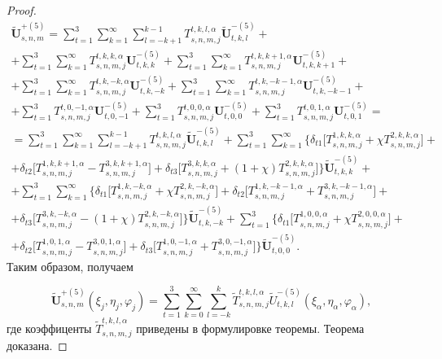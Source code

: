 \begin{proof}
\begin{multline}
\mathbf{\tilde U}_{s,n,m}^{+(5)}=\sum\limits_{t=1}^3\sum\limits_{k=1}^\infty\sum\limits_{l=-k+1}^{k-1}T_{s,n,m,j}^{t,k,l,\alpha}\mathbf{\tilde U}_{t,k,l}^{-(5)}+ \\
+\sum\limits_{t=1}^3\sum\limits_{k=1}^\infty T_{s,n,m,j}^{t,k,k,\alpha}\mathbf{U}_{t,k,k}^{-(5)}+\sum\limits_{t=1}^3\sum\limits_{k=1}^\infty T_{s,n,m,j}^{t,k,k+1,\alpha}\mathbf{U}_{t,k,k+1}^{-(5)}+ \\
+\sum\limits_{t=1}^3\sum\limits_{k=1}^\infty T_{s,n,m,j}^{t,k,-k,\alpha}\mathbf{U}_{t,k,-k}^{-(5)}+\sum\limits_{t=1}^3\sum\limits_{k=1}^\infty T_{s,n,m,j}^{t,k,-k-1,\alpha}\mathbf{U}_{t,k,-k-1}^{-(5)}+ \\
+\sum\limits_{t=1}^3 T_{s,n,m,j}^{t,0,-1,\alpha}\mathbf{U}_{t,0,-1}^{-(5)}+\sum\limits_{t=1}^3 T_{s,n,m,j}^{t,0,0,\alpha}\mathbf{U}_{t,0,0}^{-(5)}+\sum\limits_{t=1}^3 T_{s,n,m,j}^{t,0,1,\alpha}\mathbf{U}_{t,0,1}^{-(5)}= \\
=\sum\limits_{t=1}^3\sum\limits_{k=1}^\infty\sum\limits_{l=-k+1}^{k-1}T_{s,n,m,j}^{t,k,l,\alpha}\mathbf{\tilde U}_{t,k,l}^{-(5)}+\sum\limits_{t=1}^3\sum\limits_{k=1}^\infty\bigg\{\delta_{t1}\bigg\lbrack T_{s,n,m,j}^{1,k,k,\alpha}+\chi T_{s,n,m,j}^{2,k,k,\alpha}\bigg\rbrack+ \\
+\delta_{t2}\bigg\lbrack T_{s,n,m,j}^{1,k,k+1,\alpha}-T_{s,n,m,j}^{3,k,k+1,\alpha}\bigg\rbrack+\delta_{t3}\bigg\lbrack T_{s,n,m,j}^{3,k,k,\alpha}+(1+\chi)T_{s,n,m,j}^{2,k,k,\alpha}\bigg\rbrack\bigg\}\mathbf{\tilde U}_{t,k,k}^{-(5)}+ \\
+\sum\limits_{t=1}^3\sum\limits_{k=1}^\infty\bigg\{\delta_{t1}\bigg\lbrack T_{s,n,m,j}^{1,k,-k,\alpha}+\chi T_{s,n,m,j}^{2,k,-k,\alpha}\bigg\rbrack+\delta_{t2}\bigg\lbrack T_{s,n,m,j}^{1,k,-k-1,\alpha}+T_{s,n,m,j}^{3,k,-k-1,\alpha}\bigg\rbrack+ \\
+\delta_{t3}\bigg\lbrack T_{s,n,m,j}^{3,k,-k,\alpha}-(1+\chi)T_{s,n,m,j}^{2,k,-k,\alpha}\bigg\rbrack\bigg\}\mathbf{\tilde U}_{t,k,-k}^{-(5)}+
\sum\limits_{t=1}^3\bigg\{\delta_{t1}\bigg\lbrack T_{s,n,m,j}^{1,0,0,\alpha}+\chi T_{s,n,m,j}^{2,0,0,\alpha}\bigg\rbrack+ \\
+\delta_{t2}\bigg\lbrack T_{s,n,m,j}^{1,0,1,\alpha}-T_{s,n,m,j}^{3,0,1,\alpha}\bigg\rbrack+\delta_{t3}\bigg\lbrack T_{s,n,m,j}^{1,0,-1,\alpha}+T_{s,n,m,j}^{3,0,-1,\alpha}\bigg\rbrack\bigg\}\mathbf{\tilde U}_{t,0,0}^{-(5)}.
\label{eq:1:121p}
\end{multline}
Таким образом, получаем

\begin{equation}
\mathbf{\tilde U}_{s,n,m}^{+(5)}(\xi_j,\eta_j,\varphi_j)=\sum\limits_{t=1}^3\sum\limits_{k=0}^\infty\sum\limits_{l=-k}^k\tilde T_{s,n,m,j}^{t,k,l,\alpha}\tilde U_{t,k,l}^{-(5)}(\xi_\alpha,\eta_\alpha,\varphi_\alpha),
\label{eq:1:122p}
\end{equation}
где коэффиценты $\tilde T_{s,n,m,j}^{t,k,l,\alpha}$ приведены в формулировке теоремы. Теорема доказана.
\end{proof}

